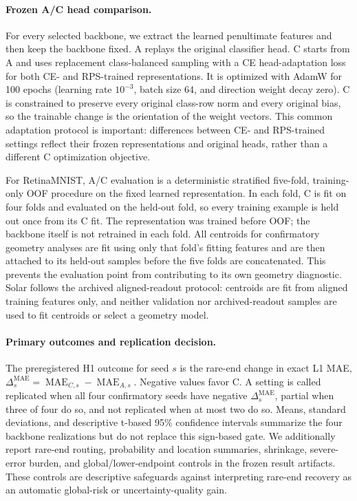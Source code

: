 \paragraph{Frozen A/C head comparison.}
For every selected backbone, we extract the learned penultimate features and then keep the backbone fixed. A replays the original classifier head. C starts from A and uses replacement class-balanced sampling with a CE head-adaptation loss for both CE- and RPS-trained representations. It is optimized with AdamW for 100 epochs (learning rate \(10^{-3}\), batch size 64, and direction weight decay zero). C is constrained to preserve every original class-row norm and every original bias, so the trainable change is the orientation of the weight vectors. This common adaptation protocol is important: differences between CE- and RPS-trained settings reflect their frozen representations and original heads, rather than a different C optimization objective.

For RetinaMNIST, A/C evaluation is a deterministic stratified five-fold, training-only OOF procedure on the fixed learned representation. In each fold, C is fit on four folds and evaluated on the held-out fold, so every training example is held out once from its C fit. The representation was trained before OOF; the backbone itself is not retrained in each fold. All centroids for confirmatory geometry analyses are fit using only that fold's fitting features and are then attached to its held-out samples before the five folds are concatenated. This prevents the evaluation point from contributing to its own geometry diagnostic. Solar follows the archived aligned-readout protocol: centroids are fit from aligned training features only, and neither validation nor archived-readout samples are used to fit centroids or select a geometry model.

\paragraph{Primary outcomes and replication decision.}
The preregistered H1 outcome for seed \(s\) is the rare-end change in exact L1 MAE, \(\Delta_s^{\mathrm{MAE}}=\operatorname{MAE}_{C,s}-\operatorname{MAE}_{A,s}\). Negative values favor C. A setting is called replicated when all four confirmatory seeds have negative \(\Delta_s^{\mathrm{MAE}}\), partial when three of four do so, and not replicated when at most two do so. Means, standard deviations, and descriptive t-based 95\% confidence intervals summarize the four backbone realizations but do not replace this sign-based gate. We additionally report rare-end routing, probability and location summaries, shrinkage, severe-error burden, and global/lower-endpoint controls in the frozen result artifacts. These controls are descriptive safeguards against interpreting rare-end recovery as an automatic global-risk or uncertainty-quality gain.

